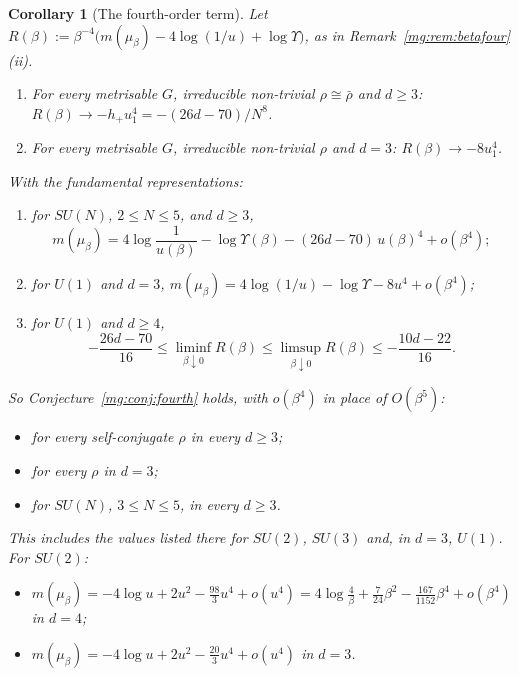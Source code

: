 \documentclass[11pt,a4paper]{article}
\newtheorem{corollary}[theorem]{Corollary}
\theoremstyle{definition}
\theoremstyle{remark}
\begin{document}
\begin{corollary}[The fourth-order term]\label{mg:cor:fourthterm}
Let $R(\beta):=\beta^{-4}\bigl(m(\mu_\beta)-4\log(1/u)+\log\Upsilon\bigr)$, as in Remark~\ref{mg:rem:betafour}(ii).
\begin{enumerate}[label=(\roman*)]
\item For every metrisable $G$, irreducible non-trivial $\rho\cong\bar\rho$ and $d\ge3$: $R(\beta)\to-h_+u_1^4=-(26d-70)/N^8$.
\item For every metrisable $G$, irreducible non-trivial $\rho$ and $d=3$: $R(\beta)\to-8u_1^4$.
\end{enumerate}
With the fundamental representations:
\begin{enumerate}[label=(\roman*),resume]
\item for $SU(N)$, $2\le N\le5$, and $d\ge3$,
\[
m(\mu_\beta)=4\log\frac1{u(\beta)}-\log\Upsilon(\beta)-(26d-70)\,u(\beta)^4+o(\beta^4);
\]
\item for $U(1)$ and $d=3$, $m(\mu_\beta)=4\log(1/u)-\log\Upsilon-8u^4+o(\beta^4)$;
\item for $U(1)$ and $d\ge4$,
\[
-\frac{26d-70}{16}\le\liminf_{\beta\downarrow0}R(\beta)\le\limsup_{\beta\downarrow0}R(\beta)\le-\frac{10d-22}{16}.
\]
\end{enumerate}
So Conjecture~\ref{mg:conj:fourth} holds, with $o(\beta^4)$ in place of $O(\beta^5)$:
\begin{itemize}
\item for every self-conjugate $\rho$ in every $d\ge3$;
\item for every $\rho$ in $d=3$;
\item for $SU(N)$, $3\le N\le5$, in every $d\ge3$.
\end{itemize}
This includes the values listed there for $SU(2)$, $SU(3)$ and, in $d=3$, $U(1)$. For $SU(2)$:
\begin{itemize}
\item $m(\mu_\beta)=-4\log u+2u^2-\frac{98}3u^4+o(u^4)=4\log\frac4\beta+\frac7{24}\beta^2-\frac{167}{1152}\beta^4+o(\beta^4)$ in $d=4$;
\item $m(\mu_\beta)=-4\log u+2u^2-\frac{20}3u^4+o(u^4)$ in $d=3$.
\end{itemize}
\end{corollary}
\end{document}
